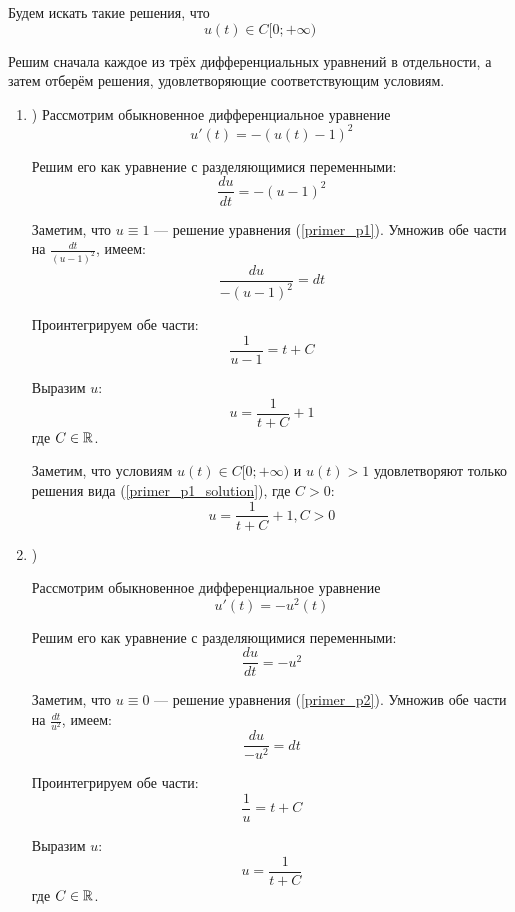 Будем искать такие решения, что
\begin{equation}
	u(t) \in C[0; +\infty)
\end{equation}

Решим сначала каждое из трёх дифференциальных уравнений в отдельности, а затем отберём решения,
удовлетворяющие соответствующим условиям.

\begin{enumerate}

\item)
Рассмотрим обыкновенное дифференциальное уравнение
\begin{equation}\label{primer_p1}
	u'(t)=-(u(t)-1)^2
\end{equation}

Решим его как уравнение с разделяющимися переменными:
$$
	\frac{du}{dt}=-(u-1)^2
$$

Заметим, что $u\equiv 1$ --- решение уравнения (\ref{primer_p1}).
Умножив обе части на $\frac{dt}{(u-1)^2}$, имеем:
$$
	\frac{du}{-(u-1)^2}=dt
$$

Проинтегрируем обе части:
$$
	\frac{1}{u-1}=t+C
$$

Выразим $u$:
\begin{equation}\label{primer_p1_solution}
	u=\frac{1}{t+C}+1
\end{equation}
где $C\in\mathbb{R}$.

Заметим, что условиям $u(t) \in C[0; +\infty)$ и $u(t)>1$ удовлетворяют только решения вида (\ref{primer_p1_solution}), где $C>0$:
\begin{equation}
	u=\frac{1}{t+C}+1, C>0
\end{equation}


\item)

Рассмотрим обыкновенное дифференциальное уравнение
\begin{equation}\label{primer_p2}
	u'(t)=-u^2(t)
\end{equation}

Решим его как уравнение с разделяющимися переменными:
$$
	\frac{du}{dt}=-u^2
$$

Заметим, что $u\equiv 0$ --- решение уравнения (\ref{primer_p2}).
Умножив обе части на $\frac{dt}{u^2}$, имеем:
$$
	\frac{du}{-u^2}=dt
$$

Проинтегрируем обе части:
$$
	\frac{1}{u}=t+C
$$

Выразим $u$:
\begin{equation}\label{primer_p2_solution}
	u=\frac{1}{t+C}
\end{equation}
где $C\in\mathbb{R}$.


\end{enumerate}
